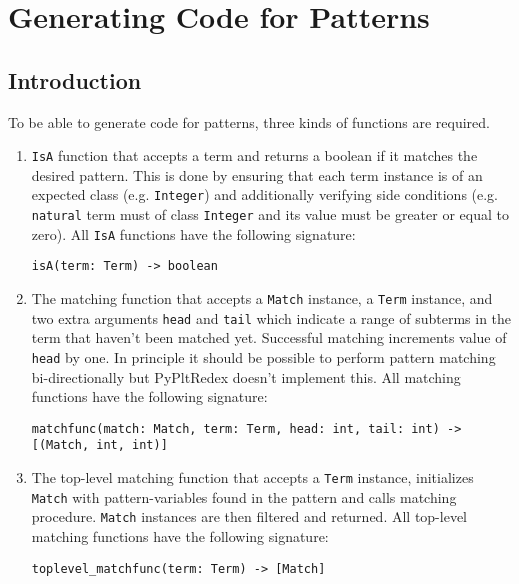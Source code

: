 \section{Generating Code for Patterns}

\subsection{Introduction}

To be able to generate code for patterns, three kinds of functions are required.

\begin{enumerate}
\item
\texttt{IsA} function that accepts a term and returns a boolean if it matches the desired pattern. This is done by ensuring that each term instance is of an expected class (e.g. \texttt{Integer}) and additionally verifying side conditions (e.g. \texttt{natural} term must of class \texttt{Integer} and its value must be greater or equal to zero). All \texttt{IsA} functions have the following signature:

\begin{verbatim}
isA(term: Term) -> boolean
\end{verbatim}

\item
The matching function that accepts a \texttt{Match} instance, a \texttt{Term} instance, and two extra arguments \texttt{head} and \texttt{tail} which indicate a range of subterms in the term that haven't been matched yet. Successful matching increments value of \texttt{head} by one. In principle it should be possible to perform pattern matching bi-directionally but PyPltRedex doesn't implement this. All matching functions have the following signature:

\begin{verbatim}
matchfunc(match: Match, term: Term, head: int, tail: int) -> [(Match, int, int)]
\end{verbatim}

\item
The top-level matching function that accepts a \texttt{Term} instance, initializes \texttt{Match} with pattern-variables found in the pattern and calls matching procedure. \texttt{Match} instances are then filtered and returned. All top-level matching functions have the following signature:
\begin{verbatim}
toplevel_matchfunc(term: Term) -> [Match]
\end{verbatim}
\end{enumerate}


